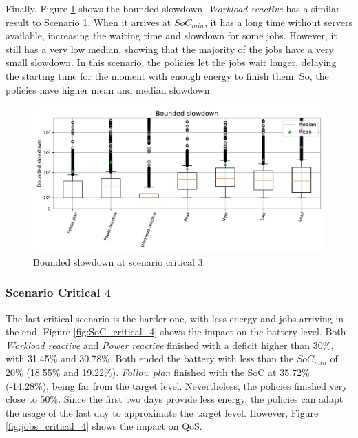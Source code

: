 Finally, Figure \ref{fig:slowdown_critical_3} shows the bounded slowdown. \emph{Workload reactive} has a similar result to Scenario 1. When it arrives at $SoC_{min}$, it has a long time without servers available, increasing the waiting time and slowdown for some jobs. However, it still has a very low median, showing that the majority of the jobs have a very small slowdown. In this scenario, the policies let the jobs wait longer, delaying the starting time for the moment with enough energy to finish them. So, the policies have higher mean and median slowdown. 

\begin{figure}[!htb]
    \centering
    \includegraphics[scale=0.55]{Images/Compensations/slowdown_critical_3.pdf}
    \caption{Bounded slowdown at scenario critical 3.}
    \label{fig:slowdown_critical_3}
\end{figure}

\clearpage

\subsubsection{Scenario Critical 4}

The last critical scenario is the harder one, with less energy and jobs arriving in the end. Figure \ref{fig:SoC_critical_4} shows the impact on the battery level. Both \emph{Workload reactive} and \emph{Power reactive} finished with a deficit higher than 30\%, with 31.45\% and 30.78\%. Both ended the battery with less than the $SoC_{min}$ of 20\% (18.55\% and 19.22\%). \emph{Follow plan} finished with the SoC at 35.72\% (-14.28\%), being far from the target level. Nevertheless, the policies finished very close to 50\%. Since the first two days provide less energy, the policies can adapt the usage of the last day to approximate the target level. However, Figure \ref{fig:jobs_critical_4} shows the impact on QoS.

